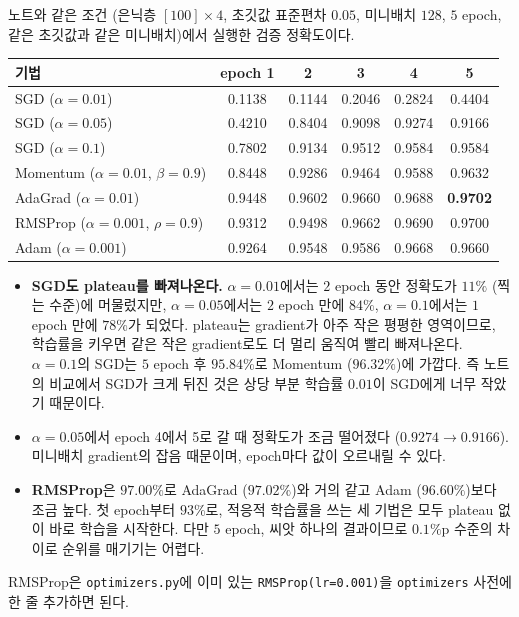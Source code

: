 \documentclass[11pt,a4paper]{article}
\begin{document}
\begin{problems}
\begin{sol}
노트와 같은 조건 (은닉층 $[100]\times4$, 초깃값 표준편차 $0.05$, 미니배치 $128$, $5$ epoch, 같은 초깃값과 같은 미니배치)에서 실행한 검증 정확도이다.
\begin{center}
\begin{tabular}{lccccc}
\toprule
기법 & epoch 1 & 2 & 3 & 4 & 5 \\
\midrule
SGD ($\alpha=0.01$) & 0.1138 & 0.1144 & 0.2046 & 0.2824 & 0.4404 \\
SGD ($\alpha=0.05$) & 0.4210 & 0.8404 & 0.9098 & 0.9274 & 0.9166 \\
SGD ($\alpha=0.1$)  & 0.7802 & 0.9134 & 0.9512 & 0.9584 & 0.9584 \\
\midrule
Momentum ($\alpha=0.01$, $\beta=0.9$) & 0.8448 & 0.9286 & 0.9464 & 0.9588 & 0.9632 \\
AdaGrad ($\alpha=0.01$) & 0.9448 & 0.9602 & 0.9660 & 0.9688 & \textbf{0.9702} \\
RMSProp ($\alpha=0.001$, $\rho=0.9$) & 0.9312 & 0.9498 & 0.9662 & 0.9690 & 0.9700 \\
Adam ($\alpha=0.001$) & 0.9264 & 0.9548 & 0.9586 & 0.9668 & 0.9660 \\
\bottomrule
\end{tabular}
\end{center}
\begin{itemize}[leftmargin=1.5em,itemsep=2pt]
\item \textbf{SGD도 plateau를 빠져나온다.} $\alpha=0.01$에서는 $2$ epoch 동안 정확도가 $11\%$ (찍는 수준)에 머물렀지만,
$\alpha=0.05$에서는 $2$ epoch 만에 $84\%$, $\alpha=0.1$에서는 $1$ epoch 만에 $78\%$가 되었다.
plateau는 gradient가 아주 작은 평평한 영역이므로, 학습률을 키우면 같은 작은 gradient로도 더 멀리 움직여 빨리 빠져나온다.
$\alpha=0.1$의 SGD는 $5$ epoch 후 $95.84\%$로 Momentum ($96.32\%$)에 가깝다.
즉 노트의 비교에서 SGD가 크게 뒤진 것은 상당 부분 학습률 $0.01$이 SGD에게 너무 작았기 때문이다.
\item $\alpha=0.05$에서 epoch 4에서 5로 갈 때 정확도가 조금 떨어졌다 ($0.9274\to0.9166$). 미니배치 gradient의 잡음 때문이며, epoch마다 값이 오르내릴 수 있다.
\item \textbf{RMSProp}은 $97.00\%$로 AdaGrad ($97.02\%$)와 거의 같고 Adam ($96.60\%$)보다 조금 높다.
첫 epoch부터 $93\%$로, 적응적 학습률을 쓰는 세 기법은 모두 plateau 없이 바로 학습을 시작한다.
다만 $5$ epoch, 씨앗 하나의 결과이므로 $0.1\%$p 수준의 차이로 순위를 매기기는 어렵다.
\end{itemize}
RMSProp은 \texttt{optimizers.py}에 이미 있는 \texttt{RMSProp(lr=0.001)}을 \texttt{optimizers} 사전에 한 줄 추가하면 된다.
\end{sol}


\end{problems}
\end{document}
